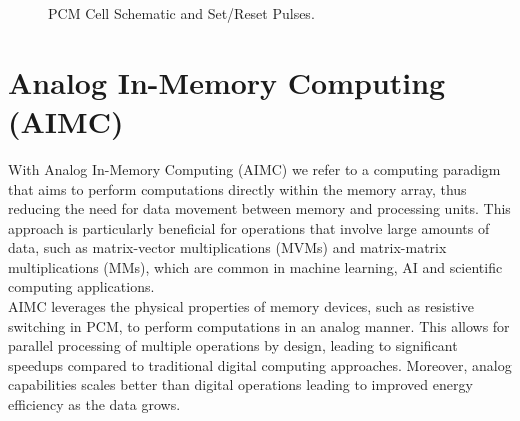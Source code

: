 \begin{figure}[H]
  \centering
  \hspace{1cm} 
  \caption{PCM Cell Schematic and Set/Reset Pulses.}
  \label{fig:PCM-cell-and-pulses}
\end{figure}

\section{Analog In-Memory Computing (AIMC)}\label{sec:aimc}
With Analog In-Memory Computing (AIMC) we refer to a computing paradigm that aims to perform computations directly within the memory array, 
  thus reducing the need for data movement between memory and processing units.
This approach is particularly beneficial for operations that involve large amounts of data, such as matrix-vector multiplications (MVMs) 
and matrix-matrix multiplications (MMs), which are common in machine learning, AI and scientific computing applications.\\
AIMC leverages the physical properties of memory devices, such as resistive switching in PCM, to perform computations in an analog manner.
This allows for parallel processing of multiple operations by design, leading to significant speedups compared to traditional digital computing approaches.
Moreover, analog capabilities scales better than digital operations leading to improved energy efficiency as the data grows.

